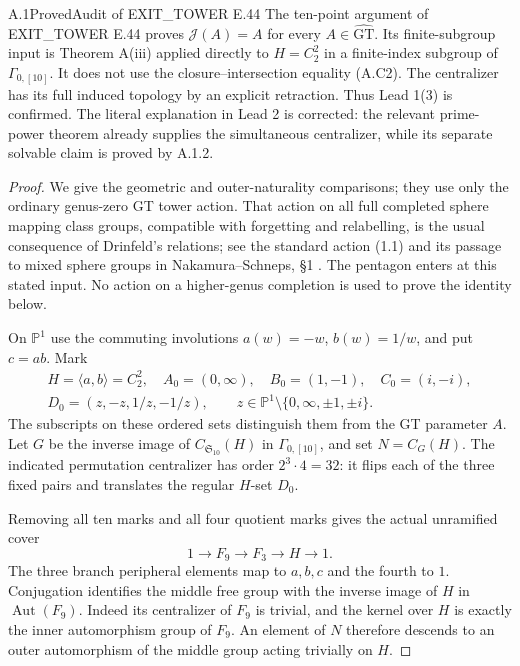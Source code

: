 \begin{result}{A.1}{Proved}{Audit of EXIT\_TOWER E.44}
The ten-point argument of EXIT\_TOWER E.44 proves
$\mathcal J(A)=A$ for every $A\in\widehat{\mathrm{GT}}$.
Its finite-subgroup input is Theorem A(iii) applied directly to
$H=C_2^2$ in a finite-index subgroup of $\Gamma_{0,[10]}$.
It does not use the closure--intersection equality (A.C2).
The centralizer has its full induced topology by an explicit
retraction.  Thus Lead 1(3) is confirmed.  The literal explanation
in Lead 2 is corrected: the relevant prime-power theorem already
supplies the simultaneous centralizer, while its separate solvable
claim is proved by A.1.2.
\end{result}
\begin{proof}
We give the geometric and outer-naturality comparisons; they use
only the ordinary genus-zero GT tower action.  That action on all
full completed sphere mapping class groups, compatible with
forgetting and relabelling, is the usual consequence of Drinfeld's
relations; see the standard action (1.1) and its passage to mixed
sphere groups in Nakamura--Schneps, \S1 \cite{CA_NS2000}.
The pentagon enters at this stated input.  No action on
a higher-genus completion is used to prove the identity below.

On $\mathbb P^1$ use the commuting involutions
$a(w)=-w$, $b(w)=1/w$, and put $c=ab$.  Mark
\[
\begin{gathered}
 H=\langle a,b\rangle=C_2^2,\quad
 A_0=(0,\infty),\quad B_0=(1,-1),\quad C_0=(i,-i),\\
 D_0=(z,-z,1/z,-1/z),\qquad
 z\in\mathbb P^1\setminus\{0,\infty,\pm1,\pm i\}.
\end{gathered}                                                \tag{A.C10}
\]
The subscripts on these ordered sets distinguish them from the GT
parameter $A$.  Let $G$ be the inverse image of
$C_{\mathfrak S_{10}}(H)$ in $\Gamma_{0,[10]}$, and set
$N=C_G(H)$.  The indicated permutation centralizer has order
$2^3\cdot4=32$: it flips each of the three fixed pairs and
translates the regular $H$-set $D_0$.

Removing all ten marks and all four quotient marks gives the
actual unramified cover
\[
 1\longrightarrow F_9\longrightarrow F_3
       \longrightarrow H\longrightarrow1.                 \tag{A.C11}
\]
The three branch peripheral elements map to $a,b,c$ and the
fourth to $1$.  Conjugation identifies the middle free group
with the inverse image of $H$ in $\operatorname{Aut}(F_9)$.
Indeed its centralizer of $F_9$ is trivial, and the kernel over
$H$ is exactly the inner automorphism group of $F_9$.
An element of $N$ therefore descends to an outer automorphism
of the middle group acting trivially on $H$.


\end{proof}
